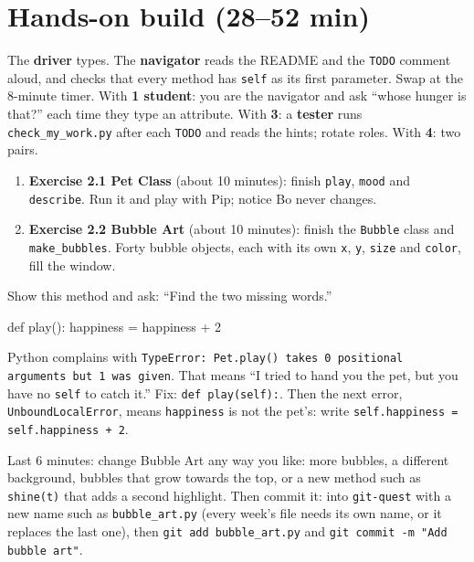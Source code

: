 \section{Hands-on build (28--52 min)}
\begin{pairroles}
The \textbf{driver} types. The \textbf{navigator} reads the README and the \texttt{TODO} comment aloud, and checks that every method has \texttt{self} as its first parameter. Swap at the 8-minute timer.
With \textbf{1 student}: you are the navigator and ask \enquote{whose hunger is that?} each time they type an attribute. With \textbf{3}: a \textbf{tester} runs \texttt{check\_my\_work.py} after each \texttt{TODO} and reads the hints; rotate roles. With \textbf{4}: two pairs.
\end{pairroles}
\begin{enumerate}[itemsep=2pt]
  \item \textbf{Exercise 2.1 Pet Class} (about 10 minutes): finish \texttt{play}, \texttt{mood} and \texttt{describe}. Run it and play with Pip; notice Bo never changes.
  \item \textbf{Exercise 2.2 Bubble Art} (about 10 minutes): finish the \texttt{Bubble} class and \texttt{make\_bubbles}. Forty bubble objects, each with its own \texttt{x}, \texttt{y}, \texttt{size} and \texttt{color}, fill the window.
\end{enumerate}

\begin{bughunt}
Show this method and ask: \enquote{Find the two missing words.}
\begin{pycode}
    def play():
        happiness = happiness + 2
\end{pycode}
Python complains with \texttt{TypeError: Pet.play() takes 0 positional arguments but 1 was given}. That means \enquote{I tried to hand you the pet, but you have no \texttt{self} to catch it.} Fix: \texttt{def play(self):}. Then the next error, \texttt{UnboundLocalError}, means \texttt{happiness} is not the pet's: write \texttt{self.happiness = self.happiness + 2}.
\end{bughunt}

\begin{freebuild}
Last 6 minutes: change Bubble Art any way you like: more bubbles, a different background, bubbles that grow towards the top, or a new method such as \texttt{shine(t)} that adds a second highlight. Then commit it:  into \texttt{git-quest} with a new name such as \texttt{bubble\_art.py} (every week's file needs its own name, or it replaces the last one), then \texttt{git add bubble\_art.py} and \texttt{git commit -m "Add bubble art"}.
\end{freebuild}

